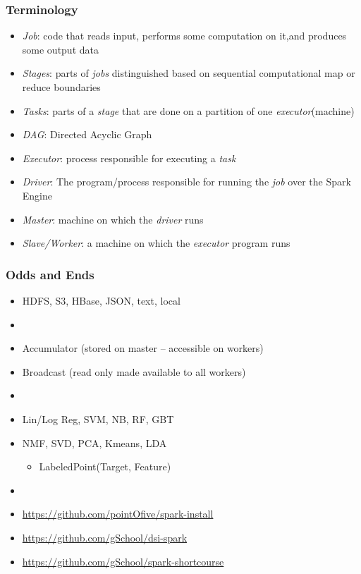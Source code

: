 \documentclass[xcolor={dvipsnames}]{beamer}
\begin{document}
\frame
{
\frametitle{Terminology}

\begin{itemize}
\setlength\itemsep{.75em}
\item \emph{Job}: code that reads input, performs some computation on it,and produces some output data 
\item \emph{Stages}:  parts of \emph{jobs} 
 distinguished based on sequential computational map or reduce boundaries
\item \emph{Tasks}: parts of a \emph{stage} that are done on a partition of one \emph{executor}(machine)
\item \emph{DAG}: Directed Acyclic Graph
\item \emph{Executor}: process responsible for executing a \emph{task}
\item \emph{Driver}: The program/process responsible for running the \emph{job} over the Spark Engine
\item \emph{Master}: machine on which the \emph{driver} runs
\item \emph{Slave/Worker}: a machine on which the \emph{executor} program runs
\end{itemize}
}


\frame
{
\frametitle{Odds and Ends}

\begin{itemize}
\item  HDFS, S3, HBase, JSON, text, local 
\item[]
\item Accumulator (stored on master -- accessible on workers)
\item Broadcast (read only made available to all workers)
\item[]
\item Lin/Log Reg, SVM, NB, RF, GBT
\item NMF, SVD, PCA, Kmeans, LDA
\begin{itemize}
\item LabeledPoint(Target, Feature)
\end{itemize}
\item[]
\item \url{https://github.com/pointOfive/spark-install}
\item \url{https://github.com/gSchool/dsi-spark}
\item \url{https://github.com/gSchool/spark-shortcourse}
\end{itemize}





}
\end{document}
